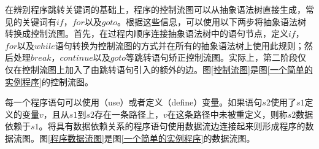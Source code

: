 在辨别程序跳转关键词的基础上，程序的控制流图可以从抽象语法树直接生成，常见的关键词有$if$，$for$以及$goto$。根据这些信息，可以使用以下两步将抽象语法树转换成控制流图。首先，在过程内顺序连接抽象语法树中的语句节点，定义$if$，$for$以及$while$语句转换为控制流图的方式并在所有的抽象语法树上使用此规则；然后处理$break$，$continue$以及$goto$等跳转语句矫正控制流图。实际上，第二阶段仅仅在控制流图上加入了由跳转语句引入的额外的边。图\ref{控制流图}是图\ref{一个简单的实例程序}的控制流图。

每一个程序语句可以使用（use）或者定义（define）变量。如果语句$s2$使用了$s1$定义的变量$v$，且从$s1$到$s2$存在一条路径上，$v$在这条路径中未被重定义，则称$s2$数据依赖于$s1$。将具有数据依赖关系的程序语句使用数据流边连接起来则形成程序的数据流图。图\ref{程序数据流图}是图\ref{一个简单的实例程序}的数据流图。






%

